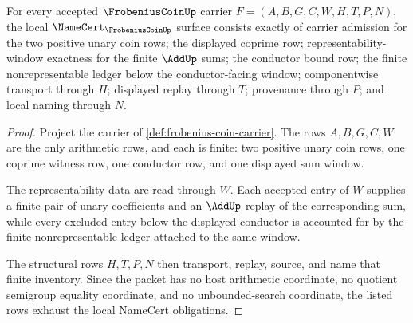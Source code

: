 \begin{theorem}
\label{thm:frobenius-coin-namecert-obligations}
For every accepted $\FrobeniusCoinUp$ carrier $F=(A,B,G,C,W,H,T,P,N)$, the local $\NameCert_{\FrobeniusCoinUp}$ surface consists exactly of carrier admission for the two positive unary coin rows; the displayed coprime row; representability-window exactness for the finite $\AddUp$ sums; the conductor bound row; the finite nonrepresentable ledger below the conductor-facing window; componentwise transport through $H$; displayed replay through $T$; provenance through $P$; and local naming through $N$.
\end{theorem}
\begin{proof}
Project the carrier of \autoref{def:frobenius-coin-carrier}. The rows $A,B,G,C,W$ are the only arithmetic rows, and each is finite: two positive unary coin rows, one coprime witness row, one conductor row, and one displayed sum window.

The representability data are read through $W$. Each accepted entry of $W$ supplies a finite pair of unary coefficients and an $\AddUp$ replay of the corresponding sum, while every excluded entry below the displayed conductor is accounted for by the finite nonrepresentable ledger attached to the same window.

The structural rows $H,T,P,N$ then transport, replay, source, and name that finite inventory. Since the packet has no host arithmetic coordinate, no quotient semigroup equality coordinate, and no unbounded-search coordinate, the listed rows exhaust the local NameCert obligations.
\end{proof}

